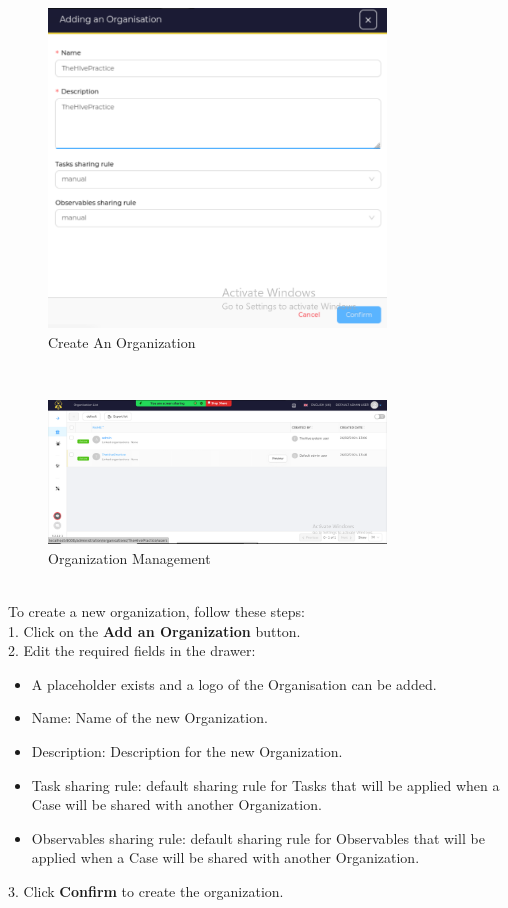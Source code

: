 \documentclass{article}
\begin{document}
\begin{figure}[ht]
    \centering
    \includegraphics[width=0.8\textwidth]{img14.png}
    \caption{Create An Organization}
    \label{fig:org}
\end{figure}\\
\begin{figure}[ht]
    \centering
    \includegraphics[width=0.8\textwidth]{img15.png}
    \caption{Organization Management}
    \label{fig:org}
\end{figure}\\
To create a new organization, follow these steps: \\
1. Click on the \textbf{Add an Organization} button.\\
2. Edit the required fields in the drawer:
    \begin{itemize}
        \item A placeholder exists and a logo of the Organisation can be added.
        \item Name: Name of the new Organization.
        \item Description: Description for the new Organization.
        \item Task sharing rule: default sharing rule for Tasks that will be applied when a Case will be shared with another Organization.
        \item Observables sharing rule: default sharing rule for Observables that will be applied when a Case will be shared with another Organization.
    \end{itemize}
3. Click \textbf{Confirm} to create the organization.
\end{document}
